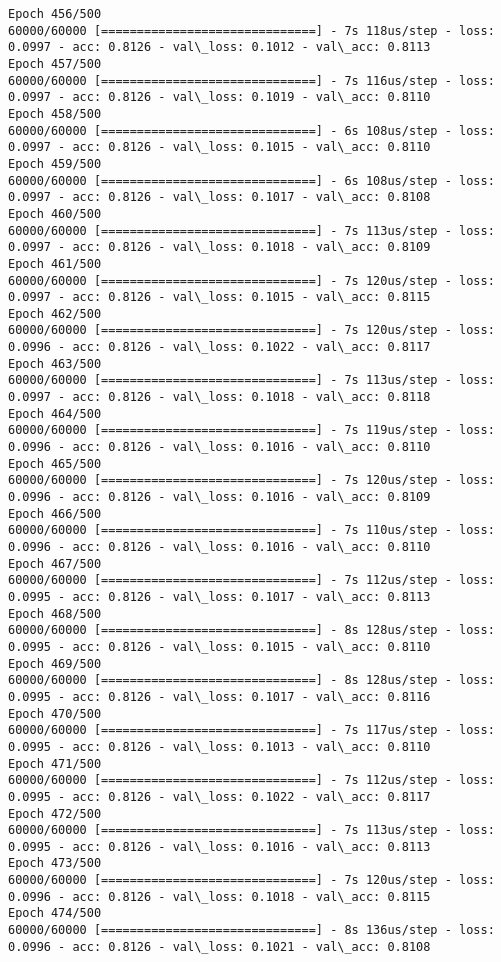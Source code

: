 \documentclass[11pt]{article}
\begin{document}
\begin{Verbatim}[commandchars=\\\{\}]
Epoch 456/500
60000/60000 [==============================] - 7s 118us/step - loss: 0.0997 - acc: 0.8126 - val\_loss: 0.1012 - val\_acc: 0.8113
Epoch 457/500
60000/60000 [==============================] - 7s 116us/step - loss: 0.0997 - acc: 0.8126 - val\_loss: 0.1019 - val\_acc: 0.8110
Epoch 458/500
60000/60000 [==============================] - 6s 108us/step - loss: 0.0997 - acc: 0.8126 - val\_loss: 0.1015 - val\_acc: 0.8110
Epoch 459/500
60000/60000 [==============================] - 6s 108us/step - loss: 0.0997 - acc: 0.8126 - val\_loss: 0.1017 - val\_acc: 0.8108
Epoch 460/500
60000/60000 [==============================] - 7s 113us/step - loss: 0.0997 - acc: 0.8126 - val\_loss: 0.1018 - val\_acc: 0.8109
Epoch 461/500
60000/60000 [==============================] - 7s 120us/step - loss: 0.0997 - acc: 0.8126 - val\_loss: 0.1015 - val\_acc: 0.8115
Epoch 462/500
60000/60000 [==============================] - 7s 120us/step - loss: 0.0996 - acc: 0.8126 - val\_loss: 0.1022 - val\_acc: 0.8117
Epoch 463/500
60000/60000 [==============================] - 7s 113us/step - loss: 0.0997 - acc: 0.8126 - val\_loss: 0.1018 - val\_acc: 0.8118
Epoch 464/500
60000/60000 [==============================] - 7s 119us/step - loss: 0.0996 - acc: 0.8126 - val\_loss: 0.1016 - val\_acc: 0.8110
Epoch 465/500
60000/60000 [==============================] - 7s 120us/step - loss: 0.0996 - acc: 0.8126 - val\_loss: 0.1016 - val\_acc: 0.8109
Epoch 466/500
60000/60000 [==============================] - 7s 110us/step - loss: 0.0996 - acc: 0.8126 - val\_loss: 0.1016 - val\_acc: 0.8110
Epoch 467/500
60000/60000 [==============================] - 7s 112us/step - loss: 0.0995 - acc: 0.8126 - val\_loss: 0.1017 - val\_acc: 0.8113
Epoch 468/500
60000/60000 [==============================] - 8s 128us/step - loss: 0.0995 - acc: 0.8126 - val\_loss: 0.1015 - val\_acc: 0.8110
Epoch 469/500
60000/60000 [==============================] - 8s 128us/step - loss: 0.0995 - acc: 0.8126 - val\_loss: 0.1017 - val\_acc: 0.8116
Epoch 470/500
60000/60000 [==============================] - 7s 117us/step - loss: 0.0995 - acc: 0.8126 - val\_loss: 0.1013 - val\_acc: 0.8110
Epoch 471/500
60000/60000 [==============================] - 7s 112us/step - loss: 0.0995 - acc: 0.8126 - val\_loss: 0.1022 - val\_acc: 0.8117
Epoch 472/500
60000/60000 [==============================] - 7s 113us/step - loss: 0.0995 - acc: 0.8126 - val\_loss: 0.1016 - val\_acc: 0.8113
Epoch 473/500
60000/60000 [==============================] - 7s 120us/step - loss: 0.0996 - acc: 0.8126 - val\_loss: 0.1018 - val\_acc: 0.8115
Epoch 474/500
60000/60000 [==============================] - 8s 136us/step - loss: 0.0996 - acc: 0.8126 - val\_loss: 0.1021 - val\_acc: 0.8108

\end{Verbatim}
\end{document}
